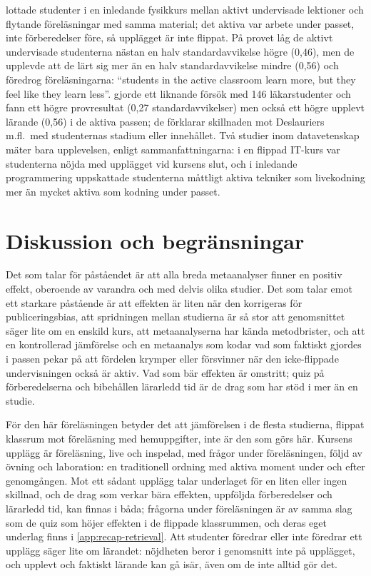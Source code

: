 \textcite{Deslauriers2019} lottade studenter i en inledande fysikkurs
mellan aktivt undervisade lektioner och flytande föreläsningar med samma
material; det aktiva var arbete under passet, inte förberedelser före,
så upplägget är inte flippat.  På provet låg de aktivt undervisade
studenterna nästan en halv standardavvikelse högre (0,46), men de
upplevde att de lärt sig mer än en halv standardavvikelse mindre (0,56)
och föredrog föreläsningarna: \enquote{students in the active classroom
learn more, but they feel like they learn
less}\autocite[19251]{Deslauriers2019}.  \textcite{Boedeker2025} gjorde
ett liknande försök med 146 läkarstudenter och fann ett högre
provresultat (0,27 standardavvikelser) men också ett högre upplevt
lärande (0,56) i de aktiva passen; de förklarar skillnaden mot
Deslauriers m.fl.\ med studenternas stadium eller innehållet.  Två
studier inom datavetenskap mäter bara upplevelsen, enligt
sammanfattningarna: i en flippad IT-kurs var studenterna nöjda med
upplägget vid kursens slut\autocite{Elliott2014}, och i inledande
programmering uppskattade studenterna måttligt aktiva tekniker som
livekodning mer än mycket aktiva som kodning under
passet\autocite{SoosaiRaj2018}.

\section{Diskussion och begränsningar}
\label{sec:recap-flippat-diskussion}

Det som talar för påståendet är att alla breda metaanalyser finner en
positiv effekt, oberoende av varandra och med delvis olika studier.  Det
som talar emot ett starkare påstående är att effekten är liten när den
korrigeras för publiceringsbias, att spridningen mellan studierna är så
stor att genomsnittet säger lite om en enskild kurs, att metaanalyserna
har kända metodbrister, och att en kontrollerad jämförelse och en
metaanalys som kodar vad som faktiskt gjordes i
passen\autocite{Jensen2015,Kapur2022} pekar på att fördelen krymper eller
försvinner när den icke-flippade undervisningen också är aktiv.  Vad som
bär effekten är omstritt; quiz på förberedelserna och bibehållen
lärarledd tid är de drag som har stöd i mer än en studie.

För den här föreläsningen betyder det att jämförelsen i de flesta
studierna, flippat klassrum mot föreläsning med hemuppgifter, inte är den
som görs här.  Kursens upplägg är föreläsning, live och inspelad, med
frågor under föreläsningen, följd av övning och laboration: en
traditionell ordning med aktiva moment under och efter genomgången.  Mot
ett sådant upplägg talar underlaget för en liten eller ingen skillnad,
och de drag som verkar bära effekten, uppföljda förberedelser och
lärarledd tid, kan finnas i båda; frågorna under föreläsningen är av samma
slag som de quiz som höjer effekten i de flippade klassrummen, och deras
eget underlag finns i \cref{app:recap-retrieval}.  Att studenter föredrar
eller inte föredrar ett upplägg säger lite om lärandet: nöjdheten beror i
genomsnitt inte på upplägget, och upplevt och faktiskt lärande kan gå
isär, även om de inte alltid gör det.

